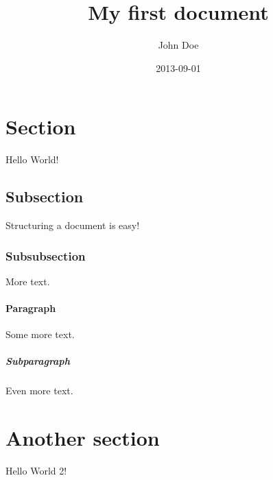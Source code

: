 \documentclass{article}
\title{My first document}
\date{2013-09-01}
\author{John Doe}
\begin{document}
    \maketitle
    \newpage


    \section{Section}
    Hello World!

    \subsection{Subsection}
    Structuring a document is easy!

    \subsubsection{Subsubsection}
    More text.

    \paragraph{Paragraph}
    Some more text.

    \subparagraph{Subparagraph}
    Even more text.

    \section{Another section}
    Hello World 2!

    
\end{document}

